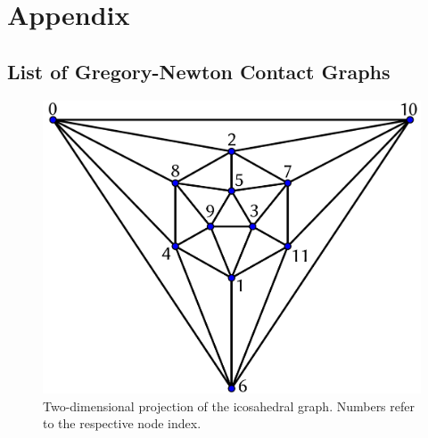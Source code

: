 
\part{Appendix}
\label{sec:appendix}

\appendix

\chapter{List of Gregory-Newton Contact Graphs}
\label{sec:listofgregorynewtonshells}

\begin{figure}[h]\centering
\includegraphics[width=.8\textwidth]{gregory-newton/ico.pdf}
    \caption{Two-dimensional projection of the icosahedral graph. Numbers refer
        to the respective node index.}
    \label{fig:icographappendix}
\end{figure}

